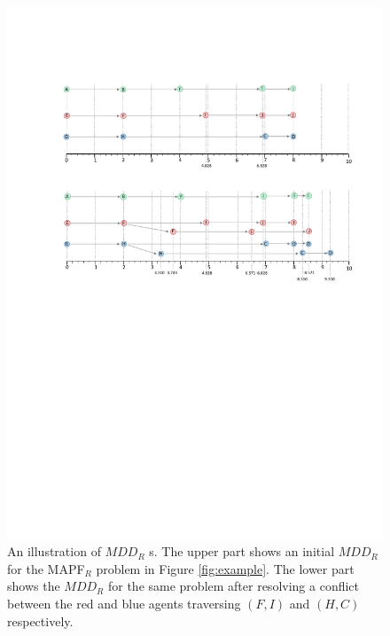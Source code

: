 \documentclass[review]{elsarticle}
\newcommand{\mddr}{\ensuremath{MDD_R}\xspace}
\newcommand{\mapfr}{\ac{MAPF}$_R$\xspace}
\begin{document}
\begin{figure}
	\centering
	\includegraphics[trim={3.0cm 14.0cm 1.0cm 4.3cm},clip,width=\columnwidth]{fig-running_makespan.pdf}
	\caption{An illustration of \mddr s. 
		The upper part shows an initial \mddr for the \mapfr problem in Figure \ref{fig:example}. The lower part shows the \mddr for the same problem after resolving a conflict between the red and blue agents traversing $(F,I)$ and $(H,C)$ respectively.}
	\label{fig:mddr}
\end{figure}
\end{document}
